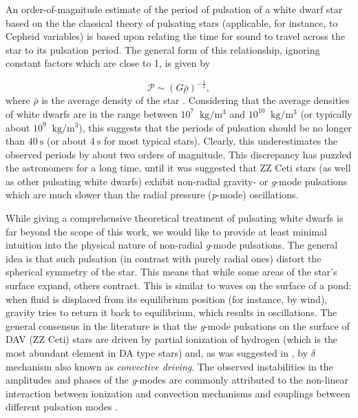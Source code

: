 \documentclass{aastex631}
\begin{document}
An order-of-magnitude estimate of the period of pulsation of a white
dwarf star based on the the classical theory of pulsating stars
(applicable, for instance, to Cepheid variables) is based upon
relating the time for sound to travel across the star to its pulsation
period. The general form of this relationship, ignoring constant
factors which are close to 1, is given by

\[
\mathcal{P} \sim (G\bar\rho)^{-\frac{1}{2}},
\]
where $\bar\rho$ is the average density of the star
\citep{Winget_2008, Catelan_2015}. Considering that the average
densities of white dwarfs are in the range between $10^7$
$\SI{}{\kilogram\per\meter^3}$ and $10^{10}$
$\SI{}{\kilogram\per\meter^3}$ (or typically about $10^9$
$\SI{}{\kilogram\per\meter^3}$), this suggests that the periods of
pulsation should be no longer than $\SI{40}{\second}$ (or about
$\SI{4}{\second}$ for most typical stars). Clearly, this
underestimates the observed periods by about two orders of
magnitude. This discrepancy has puzzled the astronomers for a long
time, until it was suggested that ZZ Ceti stars (as well as other
pulsating white dwarfs) exhibit non-radial gravity- or \emph{g}-mode
pulsations which are much slower than the radial pressure
(\emph{p}-mode) oscillations.

While giving a comprehensive theoretical treatment of pulsating white
dwarfs is far beyond the scope of this work, we would like to provide
at least minimal intuition into the physical nature of non-radial
\emph{g}-mode pulsations. The general idea is that such pulsation (in
contrast with purely radial ones) distort the spherical symmetry of
the star. This means that while some areas of the star's surface
expand, others contract. This is similar to waves on the surface of a
pond: when fluid is displaced from its equilibrium position (for
instance, by wind), gravity tries to return it back to equilibrium,
which results in oscillations. The general consensus in the literature
is that the \emph{g}-mode pulsations on the surface of DAV (ZZ Ceti)
stars are driven by partial ionization of hydrogen (which is the most
abundant element in DA type stars) and, as was suggested in
\citet{Dziem_1981}, by $\delta$ mechanism also known as
\emph{convective driving}. The observed instabilities in the
amplitudes and phases of the \emph{g}-modes are commonly attributed to
the non-linear interaction between ionization and convection
mechanisms and couplings between different pulsation modes
\citep{Bognar_2009}.
\end{document}
